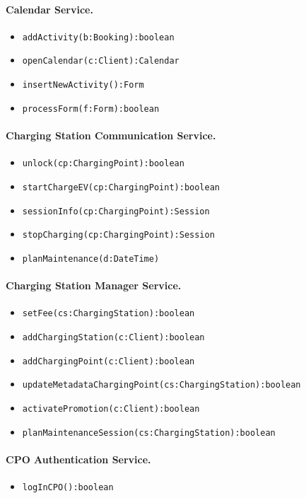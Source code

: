 \paragraph{Calendar Service.}
\begin{itemize}
    \item \verb|addActivity(b:Booking):boolean|
    \item \verb|openCalendar(c:Client):Calendar|
    \item \verb|insertNewActivity():Form|
    \item \verb|processForm(f:Form):boolean|
\end{itemize}

\paragraph{Charging Station Communication Service.}
\begin{itemize}
    \item \verb|unlock(cp:ChargingPoint):boolean|
    \item \verb|startChargeEV(cp:ChargingPoint):boolean|
    \item \verb|sessionInfo(cp:ChargingPoint):Session|
    \item \verb|stopCharging(cp:ChargingPoint):Session|
    \item \verb|planMaintenance(d:DateTime)|
\end{itemize}

\paragraph{Charging Station Manager Service.}
\begin{itemize}
    \item \verb|setFee(cs:ChargingStation):boolean|
    \item \verb|addChargingStation(c:Client):boolean|
    \item \verb|addChargingPoint(c:Client):boolean|
    \item \verb|updateMetadataChargingPoint(cs:ChargingStation):boolean|
    \item \verb|activatePromotion(c:Client):boolean|
    \item \verb|planMaintenanceSession(cs:ChargingStation):boolean|
\end{itemize}

\paragraph{CPO Authentication Service.}
\begin{itemize}
    \item \verb|logInCPO():boolean|
\end{itemize}

